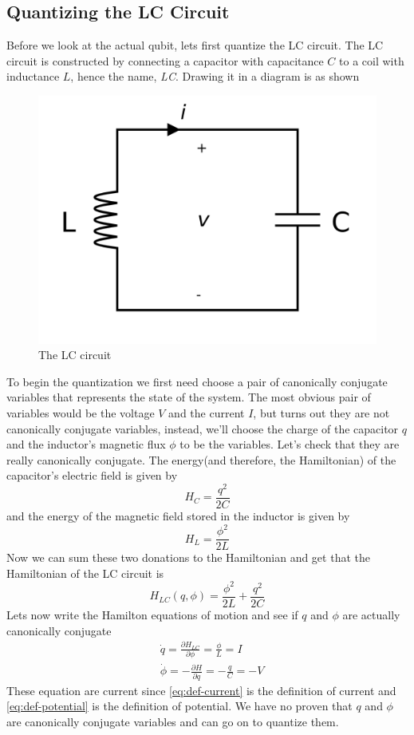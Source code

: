 \documentclass[english, a4paper, 12pt, twoside]{article}
\numberwithin{equation}{section} %
\begin{document}
\subsection{Quantizing the LC Circuit}
Before we look at the actual qubit, lets first quantize the LC circuit. The LC circuit is constructed by connecting a capacitor with capacitance $C$ to a coil with inductance $L$, hence the name, \textit{LC}. Drawing it in a diagram is as shown
\begin{figure}[H]
    \centering
    \includegraphics[width=0.6\columnwidth]{LC-circuit.png}
    \caption{The LC circuit} 
    \label{fig:LC-circuit}
\end{figure}

To begin the quantization we first need choose a pair of canonically conjugate variables that represents the state of the system. The most obvious pair of variables would be the voltage $V$ and the current $I$, but turns out they are not canonically conjugate variables, instead, we'll choose the charge of the capacitor $q$ and the inductor's magnetic flux $\phi$ to be the variables. 
Let's check that they are really canonically conjugate. The energy(and therefore, the Hamiltonian) of the capacitor's electric field is given by
\[
    H_C = \frac{q^2}{2C}
\]
and the energy of the magnetic field stored in the inductor is given by
\[
    H_L = \frac{\phi^2}{2L}
\]
Now we can sum these two donations to the Hamiltonian and get that the Hamiltonian of the LC circuit is
\[
    H_{LC}(q, \phi) = \frac{\phi^2}{2L} + \frac{q^2}{2C}
\]
Lets now write the Hamilton equations of motion and see if $q$ and $\phi$ are actually canonically conjugate
\begin{align}
    &\dot{q} = \frac{\partial H_{LC}}{\partial \phi} = \frac{\phi}{L} = I \label{eq:def-current}\\
    &\dot{\phi} = -\frac{\partial H}{\partial q} = -\frac{q}{C} = -V \label{eq:def-potential}
\end{align}
These equation are current since \ref{eq:def-current} is the definition of current and \ref{eq:def-potential} is the definition of potential. We have no proven that $q$ and $\phi$ are canonically conjugate variables and can go on to quantize them.
\end{document}
